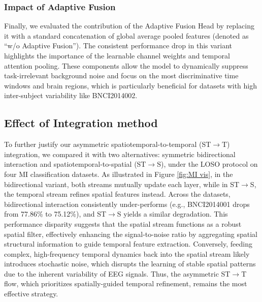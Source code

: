\documentclass[journal]{IEEEtran}
\theoremstyle{plain}
\begin{document}
\subsubsection{Impact of Adaptive Fusion}
Finally, we evaluated the contribution of the Adaptive Fusion Head by replacing it with a standard concatenation of global average pooled features (denoted as ``w/o Adaptive Fusion''). The consistent performance drop in this variant highlights the importance of the learnable channel weights and temporal attention pooling. These components allow the model to dynamically suppress task-irrelevant background noise and focus on the most discriminative time windows and brain regions, which is particularly beneficial for datasets with high inter-subject variability like BNCI2014002.


\subsection{Effect of Integration method}\label{sec:IM}
To further justify our asymmetric spatiotemporal-to-temporal (ST$\rightarrow$T) integration, we compared it with two alternatives: symmetric bidirectional interaction and spatiotemporal-to-spatial (ST$\rightarrow$S), under the LOSO protocol on four MI classification datasets. As illustrated in Figure \ref{fig:MI vis}, in the bidirectional variant, both streams mutually update each layer, while in ST$\rightarrow$S, the temporal stream refines spatial features instead. Across the datasets, bidirectional interaction consistently under-performs (e.g., BNCI2014001 drops from 77.86\% to 75.12\%), and ST$\rightarrow$S yields a similar degradation. This performance disparity suggests that the spatial stream functions as a robust spatial filter, effectively enhancing the signal-to-noise ratio by aggregating spatial structural information to guide temporal feature extraction. Conversely, feeding complex, high-frequency temporal dynamics back into the spatial stream likely introduces stochastic noise, which disrupts the learning of stable spatial patterns due to the inherent variability of EEG signals. Thus, the asymmetric ST$\rightarrow$T flow, which prioritizes spatially-guided temporal refinement, remains the most effective strategy.
\end{document}
